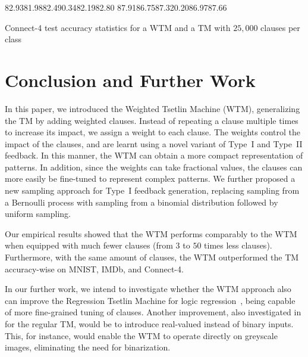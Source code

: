 \documentclass[letterpaper]{article}
\begin{document}
\begin{table}[!ht]
\centering
\tableit
{82.93}{81.98}{82.49}{0.34}{82.19}{82.80}
{87.91}{86.75}{87.32}{0.20}{86.97}{87.66}
\caption{Connect-4 test accuracy statistics for a WTM and a TM with $25{,}000$ clauses per class
}
\label{tab:connect4}
\end{table}





\section{Conclusion and Further Work}\label{sec:conclusion}
In this paper, we introduced the Weighted Tsetlin Machine (WTM), generalizing the TM by adding weighted clauses. Instead of repeating a clause multiple times to increase its impact, we assign a weight to each clause. The weights control the impact of the clauses, and are learnt using a novel variant of Type~I and Type~II feedback. In this manner, the WTM can obtain a more compact representation of patterns. In addition, since the weights can take fractional values, the clauses can more easily be fine-tuned to represent complex patterns. We further proposed a new sampling approach for Type~I feedback generation, replacing sampling from a Bernoulli process with sampling from a binomial distribution followed by uniform sampling.

Our empirical results showed that the WTM performs comparably to the WTM when equipped with much fewer clauses (from $3$ to $50$ times less clauses). Furthermore, with the same amount of clauses, the WTM outperformed the TM accuracy-wise on MNIST, IMDb, and Connect-4.

In our further work, we intend to investigate whether the WTM approach also can improve the Regression Tsetlin Machine \cite{abeyrathna2019regressiontsetlin} for logic regression~\cite{ruczinski2003logic}, being capable of more fine-grained tuning of clauses. Another improvement, also investigated in \cite{abeyrathna2019scheme} for the regular TM, would be to introduce real-valued instead of binary inputs. This, for instance, would enable the WTM to operate directly on greyscale images, eliminating the need for binarization.



\end{document}
